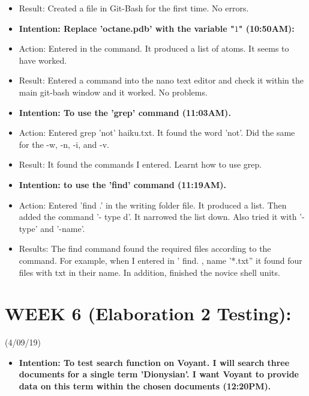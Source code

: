 \documentclass[a4paper,12pt]{article}
\begin{document}
\begin{itemize}
\begin{itemize}
\item Result: Created a file in Git-Bash for the first time. No errors.

\item \textbf{Intention: Replace 'octane.pdb' with the variable "$1$" (10:50AM):}

\item Action: Entered in the command. It produced a list of atoms. It seems to have worked.

\item Result: Entered a command into the nano text editor and check it within the main git-bash window and it worked. No problems. 

\item \textbf{Intention: To use the 'grep' command (11:03AM).} 

\item Action: Entered grep 'not' haiku.txt. It found the word 'not'. Did the same for the -w, -n, -i, and -v.

\item Result: It found the commands I entered. Learnt how to use grep.

\item \textbf {Intention: to use the 'find' command (11:19AM).}

\item Action: Entered 'find .' in the writing folder file. It produced a list. Then added the command '- type d'. It narrowed the list down. Also tried it with '-type' and '-name'.

\item Results: The find command found the required files according to the command. For example, when I entered in ' find. , name '*.txt'' it  found four files with txt in their name. In addition, finished the novice shell units. 

\end{itemize}

\section{WEEK 6 (Elaboration 2 Testing):}

(4/09/19)

\begin{itemize}

\item \textbf {Intention: To test search function on Voyant. I will search three documents for a single term 'Dionysian'. I want Voyant to provide data on this term within the chosen documents (12:20PM).} 


\end{itemize}
\end{itemize}
\end{document}
